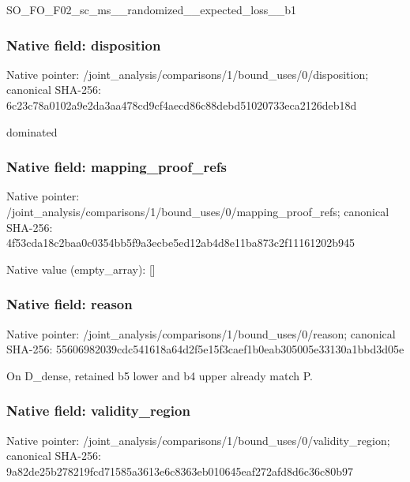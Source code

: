\documentclass[10pt,a4paper]{article}
\begin{document}
\begingroup\raggedright\sloppy SO\_\allowbreak{}FO\_\allowbreak{}F02\_\allowbreak{}sc\_\allowbreak{}ms\_\allowbreak{}\_\allowbreak{}randomized\_\allowbreak{}\_\allowbreak{}expected\_\allowbreak{}loss\_\allowbreak{}\_\allowbreak{}b1\par\endgroup

\subsubsection{Native field: disposition}
Native pointer: /joint\_\allowbreak{}analysis/comparisons/1/bound\_\allowbreak{}uses/0/disposition; canonical SHA-256: 6c23c78a0102a9e2da3aa478cd9cf4aecd86c88debd51020733eca2126deb18d

\begingroup\raggedright\sloppy dominated\par\endgroup

\subsubsection{Native field: mapping\_\allowbreak{}proof\_\allowbreak{}refs}
Native pointer: /joint\_\allowbreak{}analysis/comparisons/1/bound\_\allowbreak{}uses/0/mapping\_\allowbreak{}proof\_\allowbreak{}refs; canonical SHA-256: 4f53cda18c2baa0c0354bb5f9a3ecbe5ed12ab4d8e11ba873c2f11161202b945

Native value (empty\_\allowbreak{}array): []

\subsubsection{Native field: reason}
Native pointer: /joint\_\allowbreak{}analysis/comparisons/1/bound\_\allowbreak{}uses/0/reason; canonical SHA-256: 55606982039cdc541618a64d2f5e15f3caef1b0eab305005e33130a1bbd3d05e

\begingroup\raggedright\sloppy On D\_\allowbreak{}dense,\allowbreak{} retained b5 lower and b4 upper already match P.\par\endgroup

\subsubsection{Native field: validity\_\allowbreak{}region}
Native pointer: /joint\_\allowbreak{}analysis/comparisons/1/bound\_\allowbreak{}uses/0/validity\_\allowbreak{}region; canonical SHA-256: 9a82de25b278219fcd71585a3613e6c8363eb010645eaf272afd8d6c36c80b97
\end{document}
